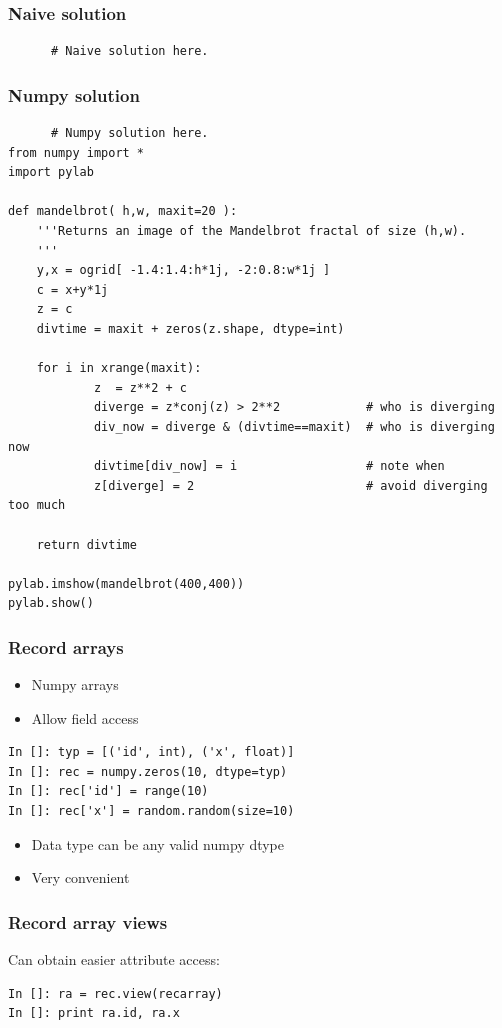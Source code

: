 \documentclass[14pt,compress]{beamer}
\newcounter{time}
\begin{document}
\begin{frame}[fragile]
  \frametitle{Naive solution}
  \begin{lstlisting}
      # Naive solution here.
  \end{lstlisting}
\end{frame}

\begin{frame}
  \frametitle{Numpy solution}
  \small
  \begin{lstlisting}
      # Numpy solution here.
from numpy import *
import pylab

def mandelbrot( h,w, maxit=20 ):
    '''Returns an image of the Mandelbrot fractal of size (h,w).
    '''
    y,x = ogrid[ -1.4:1.4:h*1j, -2:0.8:w*1j ]
    c = x+y*1j
    z = c
    divtime = maxit + zeros(z.shape, dtype=int)

    for i in xrange(maxit):
            z  = z**2 + c
            diverge = z*conj(z) > 2**2            # who is diverging
            div_now = diverge & (divtime==maxit)  # who is diverging now
            divtime[div_now] = i                  # note when
            z[diverge] = 2                        # avoid diverging too much

    return divtime

pylab.imshow(mandelbrot(400,400))
pylab.show()
  \end{lstlisting}
\end{frame}


\begin{frame}[fragile]
    \frametitle{Record arrays}
    \begin{itemize}
        \item Numpy arrays
        \item Allow field access 
    \end{itemize}
    \begin{lstlisting}
In []: typ = [('id', int), ('x', float)]
In []: rec = numpy.zeros(10, dtype=typ)
In []: rec['id'] = range(10)
In []: rec['x'] = random.random(size=10)
    \end{lstlisting}
    \begin{itemize}
        \item Data type can be any valid numpy dtype
        \item Very convenient
    \end{itemize}
\end{frame}

\begin{frame}[fragile]
    \frametitle{Record array views}
Can obtain easier attribute access:

    \begin{lstlisting}
In []: ra = rec.view(recarray)
In []: print ra.id, ra.x
    \end{lstlisting}
\end{frame}
\end{document}
